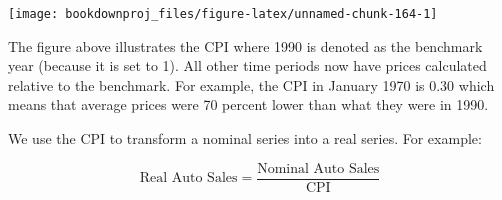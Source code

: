 \documentclass[
]{book}
\newenvironment{Shaded}{\begin{snugshade}}{\end{snugshade}}
\newcommand{\AttributeTok}[1]{\textcolor[rgb]{0.77,0.63,0.00}{#1}}
\newcommand{\ConstantTok}[1]{\textcolor[rgb]{0.00,0.00,0.00}{#1}}
\newcommand{\DecValTok}[1]{\textcolor[rgb]{0.00,0.00,0.81}{#1}}
\newcommand{\FunctionTok}[1]{\textcolor[rgb]{0.00,0.00,0.00}{#1}}
\newcommand{\NormalTok}[1]{#1}
\newcommand{\OtherTok}[1]{\textcolor[rgb]{0.56,0.35,0.01}{#1}}
\newcommand{\SpecialCharTok}[1]{\textcolor[rgb]{0.00,0.00,0.00}{#1}}
\newcommand{\StringTok}[1]{\textcolor[rgb]{0.31,0.60,0.02}{#1}}
\begin{document}
\begin{Shaded}
\end{Shaded}

\begin{center}\texttt{[image: bookdownproj\_files/figure-latex/unnamed-chunk-164-1]} \end{center}

The figure above illustrates the CPI where 1990 is denoted as the benchmark year (because it is set to 1). All other time periods now have prices calculated relative to the benchmark. For example, the CPI in January 1970 is \(0.30\) which means that average prices were 70 percent lower than what they were in 1990.

We use the CPI to transform a nominal series into a real series. For example:

\[\mbox{Real Auto Sales} = \frac{\mbox{Nominal Auto Sales}}{\mbox{CPI}}\]
\end{document}
